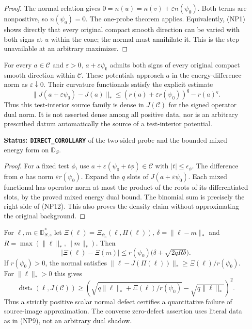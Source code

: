 \begin{proof}
The normal relation gives
$0=n(u)=n(v)+\varepsilon n(\psi_0)$.
Both terms are nonpositive, so $n(\psi_0)=0$.
The one-probe theorem applies.  Equivalently,
\textup{(NP1)} shows directly that every original
compact smooth direction can be varied with both
signs at $u$ within the cone; the normal must
annihilate it.  This is the step unavailable at
an arbitrary maximizer.
\end{proof}

\begin{proposition}
\label{prop:r12-dense-test-interior-sources}
For every $a\in\mathscr C$ and $\varepsilon>0$,
$a+\varepsilon\psi_0$ admits both signs of every
original compact smooth direction within $\mathscr C$.
These potentials approach $a$ in the energy-difference
norm as $\varepsilon\downarrow0$.  Their curvature
functionals satisfy the explicit estimate
\[
 \|J(a+\varepsilon\psi_0)-J(a)\|_*
       \le (r(a)+\varepsilon r(\psi_0))^q-r(a)^q.
 \tag{NP12}
\]
Thus this test-interior source family is dense in
$J(\mathscr C)$ for the signed operator dual norm.
It is not asserted dense among all positive data,
nor is an arbitrary prescribed datum automatically
the source of a test-interior potential.
\end{proposition}

\noindent\textbf{Status: \texttt{DIRECT\_COROLLARY}}
of the two-sided probe and the bounded mixed energy
form on $\mathbb D_S$.

\begin{proof}
For a fixed test $\phi$, use
$a+\varepsilon(\psi_0+t\phi)\in\mathscr C$
with $|t|\le\epsilon_\phi$.  The difference from
$a$ has norm $\varepsilon r(\psi_0)$.
Expand the $q$ slots of $J(a+\varepsilon\psi_0)$.
Each mixed functional has operator norm at most
the product of the roots of its differentiated
slots, by the proved mixed energy dual bound.
The binomial sum is precisely the right side of
\textup{(NP12)}.  This also proves the density
claim without approximating the original background.
\end{proof}

\begin{proposition}
\label{prop:r12-normal-probe-stability}
For $\ell,m\in\mathbb D_{S,\mathrm s}^*$ let
$\Xi(\ell)=\Xi_{\psi_0}(\ell,\Pi(\ell))$,
$\delta=\|\ell-m\|_*$ and
$R=\max(\|\ell\|_*,\|m\|_*)$.  Then
\[
            |\Xi(\ell)-\Xi(m)|
            \le r(\psi_0)\bigl(\delta+\sqrt{2qR\delta}\bigr).
 \tag{NP13}
\]
If $r(\psi_0)>0$, the normal satisfies
$\|\ell-J(\Pi(\ell))\|_*\ge\Xi(\ell)/r(\psi_0)$.
For $\|\ell\|_*>0$ this gives
\[
 \operatorname{dist}_*(\ell,J(\mathscr C))
 \ge
 \left(\sqrt{q\|\ell\|_*+\Xi(\ell)/r(\psi_0)}
                        -\sqrt{q\|\ell\|_*}\right)^2.
 \tag{NP14}
\]
Thus a strictly positive scalar normal defect certifies
a quantitative failure of source-image approximation.
The converse zero-defect assertion uses literal data
as in \textup{(NP9)}, not an arbitrary dual shadow.
\end{proposition}

